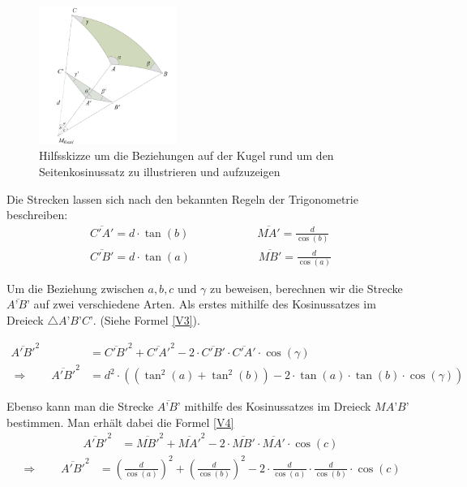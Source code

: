 \begin{refsection}
\begin{figure}[htbp]
\centering
\includegraphics[width=0.4\textwidth]{kugel/Seitenkosinus.jpg}
\caption{Hilfsskizze um die Beziehungen auf der Kugel rund um den Seitenkosinussatz zu illustrieren und aufzuzeigen}
\end{figure}

Die Strecken lassen sich nach den bekannten Regeln der Trigonometrie beschreiben:
\begin{align*}
\overline{C'A'} = d\cdot {\tan(b)} \quad \quad \quad \quad \quad \quad 
\overline{MA'} = \frac{ d }{\cos(b)} \\
\overline{C'B'} = d\cdot {\tan(a)} \quad \quad \quad \quad \quad \quad 
\overline{MB'} = \frac{ d }{\cos(a)}
\end{align*} 

Um die Beziehung zwischen $a,b,c$ und $\gamma$ zu beweisen, berechnen wir die Strecke $\overline{A’B’}$ auf zwei verschiedene Arten.
Als erstes mithilfe des Kosinussatzes im Dreieck $\triangle{A’B’C’}$. (Siehe Formel \eqref{V3}).

\begin{align}
\overline{A'B'}^{ 2 } &= \overline{ C'B' }^{ 2 } + \overline{ C'A' }^{ 2 } - 2 \cdot \overline{C'B'} \cdot \overline{ C'A' } \cdot \cos(\gamma) \nonumber \\ 
\Rightarrow \quad \quad
\overline{A'B'}^{ 2 } &= d^{ 2 } \cdot \left(\left(\tan^{ 2 }(a) + \tan^{ 2 }(b)\right) - 2\cdot \tan(a) \cdot \tan(b) \cdot \cos(\gamma)\right) 
\label {V3} 
\end{align}

Ebenso kann man die Strecke $\overline{A’B’}$ mithilfe des Kosinussatzes im Dreieck $MA’B’$ bestimmen. Man erhält dabei die Formel \eqref{V4}
\begin{align*}
\overline{A'B'}^{2} &= \overline{MB'}^{2} + \overline{MA'}^{2} - 2\cdot \overline{MB'} \cdot \overline{MA'} \cdot \cos(c)
\end{align*}
\begin{align}
\Rightarrow \quad \quad
\overline{A'B'}^{ 2 } &= \left(\frac{ d }{\cos(a) }  \right)^{ 2 } + \left(\frac{ d }{\cos(b)}  \right)^{ 2 } - 2 \cdot \frac{ d }{\cos(a)} \cdot \frac{ d }{\cos(b)} \cdot \cos(c) 
\label{V4}
\end{align}


\end{refsection}
